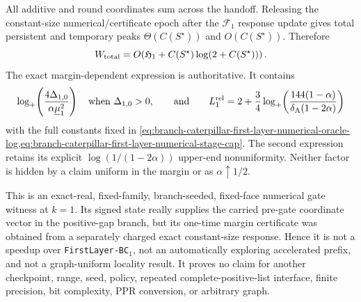 \begin{theorem}
All additive and round coordinates sum across the handoff.  Releasing the
constant-size numerical/certificate epoch after the $\mathcal F_1$ response
update gives total persistent and temporary peaks
$\Theta(C(S^\star))$ and $O(C(S^\star))$.  Therefore
\begin{equation}
 W_{\rm total}
 =O\!\left(
   \mathfrak H_1+C(S^\star)\log(2+C(S^\star))
       \right).
 \label{eq:branch-caterpillar-first-layer-numerical-total-work}
\end{equation}
The exact margin-dependent expression is authoritative.  It contains
\begin{equation*}
 \log_+\!\left(
 \frac{4\Delta_{1,0}}{\alpha\underline\mu_1^2}
             \right)
 \quad\text{when }\Delta_{1,0}>0,
 \qquad\text{and}\qquad
 L_1^{\rm rel}=2+\frac34\log_+\!\left(
  \frac{144(1-\alpha)}{\delta_{\rm A}(1-2\alpha)}\right)
\end{equation*}
with the full constants fixed in
\cref{eq:branch-caterpillar-first-layer-numerical-oracle-log,eq:branch-caterpillar-first-layer-numerical-stage-cap}.
The second expression retains its explicit
$\log(1/(1-2\alpha))$ upper-end nonuniformity.  Neither factor is hidden by a
claim uniform in the margin or as $\alpha\uparrow1/2$.

This is an exact-real, fixed-family, branch-seeded, fixed-face numerical
gate witness at $k=1$.  Its signed state really supplies the carried
pre-gate coordinate vector in the positive-gap branch, but its one-time
margin certificate was obtained from a separately charged exact
constant-size response.  Hence it is not a speedup over
\texttt{FirstLayer-BC}$_1$, not an automatically exploring accelerated
prefix, and not a graph-uniform locality result.  It proves no claim for
another checkpoint, range, seed, policy, repeated complete-positive-list
interface, finite precision, bit complexity, PPR conversion, or arbitrary
graph.
\end{theorem}

